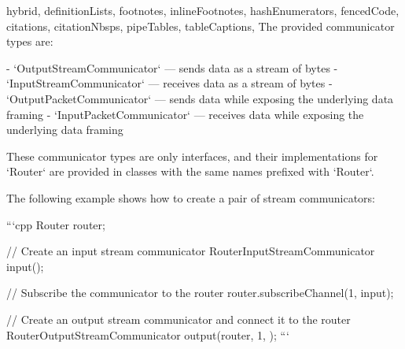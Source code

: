 \begin{markdown*}{%
  hybrid,
  definitionLists,
  footnotes,
  inlineFootnotes,
  hashEnumerators,
  fencedCode,
  citations,
  citationNbsps,
  pipeTables,
  tableCaptions,
}
The provided communicator types are:

- `OutputStreamCommunicator` --- sends data as a stream of bytes
- `InputStreamCommunicator` --- receives data as a stream of bytes
- `OutputPacketCommunicator` --- sends data while exposing the underlying data framing
- `InputPacketCommunicator` --- receives data while exposing the underlying data framing

These communicator types are only interfaces, and their implementations for `Router` are provided in classes with the same names prefixed with `Router`.

The following example shows how to create a pair of stream communicators:

```cpp
Router router;

// Create an input stream communicator
RouterInputStreamCommunicator input({});

// Subscribe the communicator to the router
router.subscribeChannel(1, input);

// Create an output stream communicator and connect it to the router
RouterOutputStreamCommunicator output(router, 1, {});
```


\end{markdown*}
